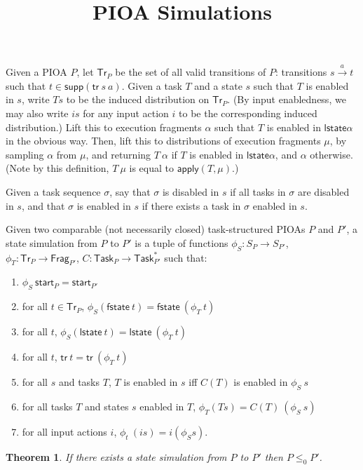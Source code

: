\documentclass{article}
\newcommand{\tr}{\mathsf{tr}}
\newcommand{\start}{\mathsf{start}}
\newcommand{\supp}{\mathsf{supp}}
\newcommand{\Frag}{\mathsf{Frag}}
\newcommand{\Tr}{\mathsf{Tr}}
\newcommand{\Task}{\mathsf{Task}}
\newcommand{\lst}{\mathsf{lstate}}
\newcommand{\fst}{\mathsf{fstate}}
\newtheorem{theorem}{Theorem}
\begin{document}
\title{PIOA Simulations}

\maketitle

Given a PIOA $P$, let $\Tr_P$ be the set of all valid transitions of $P$: transitions $s \xrightarrow{a} t$ such that $t \in \supp(\tr\ s\ a)$. Given a task $T$ and a state $s$ such that $T$ is enabled in $s$, write $Ts$ to be the induced distribution on $\Tr_P$. (By input enabledness, we
may also write $is$ for any input action $i$ to be the corresponding induced distribution.) Lift this to execution fragments $\alpha$ such that $T$ is enabled in $\lst \alpha$ in the obvious way. Then, lift this to distributions of execution fragments $\mu$, by sampling $\alpha$ from $\mu$, and returning $T\ \alpha$ if $T$ is enabled in $\lst \alpha$, and $\alpha$ otherwise. (Note by this definition, $T\ \mu$ is equal to $\textsf{apply}(T, \mu)$.)

Given a task sequence $\sigma$, say that $\sigma$ is disabled in $s$ if all tasks in $\sigma$ are disabled in $s$, and that $\sigma$ is enabled in $s$ if there exists a task in $\sigma$ enabled in $s$.

Given two comparable (not necessarily closed) task-structured PIOAs $P$ and $P'$, a state simulation from $P$ to $P'$ is a tuple of functions $\phi_S : S_P \to S_{P'}$, $\phi_T : \Tr_P \to \Frag_{P'}$, $C : \Task_P \to \Task_{P'}^*$ such that:
\begin{enumerate}
    \item $\phi_S\ \start_P = \start_{P'}$
    \item for all $t \in \Tr_P$, $\phi_S (\fst\ t) = \fst\ (\phi_T\ t)$
    \item for all $t$, $\phi_S (\lst\ t) = \lst\ (\phi_T\ t)$
    \item for all $t$, $\tr\ t = \tr\ (\phi_T\ t)$
    \item for all $s$ and tasks $T$, $T$ is enabled in $s$ iff $C(T)$ is enabled in $\phi_S\ s$
    \item for all tasks $T$ and states $s$ enabled in $T$, $\phi_T (Ts) = C(T)\ (\phi_S\ s)$
    \item for all input actions $i$, $\phi_t\ (i s) = i (\phi_S s)$.
\end{enumerate}

\begin{theorem}
    If there exists a state simulation from $P$ to $P'$ then $P \leq_0 P'$.
\end{theorem}
\end{document}
